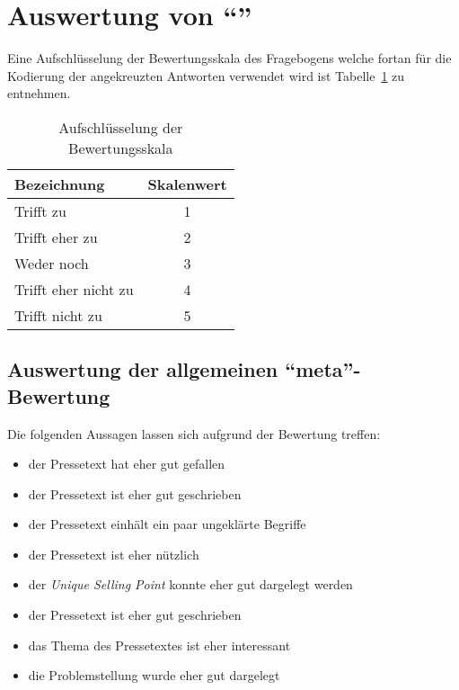 


 





\section{Auswertung von \enquote{\varpressetext}}

Eine Aufschlüsselung der Bewertungsskala des Fragebogens welche fortan für die
Kodierung der angekreuzten Antworten verwendet wird ist
Tabelle~\ref{tab:skala} zu entnehmen.

\begin{table}[!ht]
    \caption{Aufschlüsselung der Bewertungsskala}
    \label{tab:skala}
    \begin{center}
        \begin{tabular}{lc}
        \toprule
        \textbf{Bezeichnung} & \textbf{Skalenwert} \\
        \midrule
        Trifft zu & 1 \\
        Trifft eher zu & 2 \\
        Weder noch & 3 \\
        Trifft eher nicht zu & 4 \\
        Trifft nicht zu & 5 \\
        \bottomrule
        \end{tabular}
    \end{center}
\end{table}

\subsection{Auswertung der allgemeinen \enquote{meta}-Bewertung}

Die folgenden Aussagen lassen sich aufgrund der Bewertung treffen:

\begin{itemize}
    \item der Pressetext hat eher gut gefallen
    \item der Pressetext ist eher gut geschrieben
    \item der Pressetext einhält ein paar ungeklärte Begriffe
    \item der Pressetext ist eher nützlich
    \item der \emph{Unique Selling Point} konnte eher gut dargelegt werden
    \item der Pressetext ist eher gut geschrieben
    \item das Thema des Pressetextes ist eher interessant
    \item die Problemstellung wurde eher gut dargelegt
\end{itemize}

